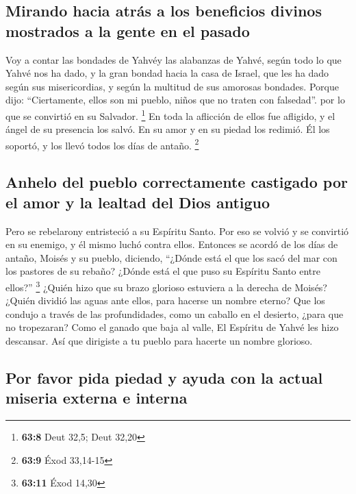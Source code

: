 \hypertarget{mirando-hacia-atruxe1s-a-los-beneficios-divinos-mostrados-a-la-gente-en-el-pasado}{%
\subsection{Mirando hacia atrás a los beneficios divinos mostrados a la
gente en el
pasado}\label{mirando-hacia-atruxe1s-a-los-beneficios-divinos-mostrados-a-la-gente-en-el-pasado}}

 Voy a contar las bondades de Yahvéy las alabanzas de
Yahvé, según todo lo que Yahvé nos ha dado, y la gran bondad hacia la
casa de Israel, que les ha dado según sus misericordias, y según la
multitud de sus amorosas bondades.  Porque dijo:
``Ciertamente, ellos son mi pueblo, niños que no traten con falsedad''.
por lo que se convirtió en su Salvador. \footnote{\textbf{63:8} Deut
  32,5; Deut 32,20}  En toda la aflicción de ellos fue
afligido, y el ángel de su presencia los salvó. En su amor y en su
piedad los redimió. Él los soportó, y los llevó todos los días de
antaño. \footnote{\textbf{63:9} Éxod 33,14-15}

\hypertarget{anhelo-del-pueblo-correctamente-castigado-por-el-amor-y-la-lealtad-del-dios-antiguo}{%
\subsection{Anhelo del pueblo correctamente castigado por el amor y la
lealtad del Dios
antiguo}\label{anhelo-del-pueblo-correctamente-castigado-por-el-amor-y-la-lealtad-del-dios-antiguo}}

 Pero se rebelarony entristeció a su Espíritu Santo. Por
eso se volvió y se convirtió en su enemigo, y él mismo luchó contra
ellos.  Entonces se acordó de los días de antaño, Moisés
y su pueblo, diciendo, ``¿Dónde está el que los sacó del mar con los
pastores de su rebaño? ¿Dónde está el que puso su Espíritu Santo entre
ellos?'' \footnote{\textbf{63:11} Éxod 14,30}  ¿Quién
hizo que su brazo glorioso estuviera a la derecha de Moisés? ¿Quién
dividió las aguas ante ellos, para hacerse un nombre eterno?
 Que los condujo a través de las profundidades, como un
caballo en el desierto, ¿para que no tropezaran?  Como el
ganado que baja al valle, El Espíritu de Yahvé les hizo descansar. Así
que dirigiste a tu pueblo para hacerte un nombre glorioso.

\hypertarget{por-favor-pida-piedad-y-ayuda-con-la-actual-miseria-externa-e-interna}{%
\subsection{Por favor pida piedad y ayuda con la actual miseria externa
e
interna}\label{por-favor-pida-piedad-y-ayuda-con-la-actual-miseria-externa-e-interna}}

